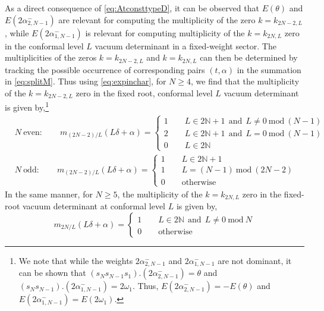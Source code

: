 As a direct consequence of \eqref{eq:AtconsttypeD}, it can be observed that $E(\theta)$ and $E(2\alpha^-_{2,N-1})$ are relevant for computing the multiplicity of the zero $k = k_{2N-2,L}$, while $E(2\alpha^-_{1,N-1})$ is relevant for computing multiplicity of the $k = k_{2N,L}$ zero in the conformal level $L$ vacuum determinant in a fixed-weight sector. The multiplicities of the zeros $k = k_{2N-2,L}$ and $k = k_{2N,L}$ can then be determined by tracking the possible occurrence of corresponding pairs $(t,\alpha)$ in the summation in \eqref{eq:splitM}. Thus using \eqref{eq:expinchar}, for $N \geqslant 4$, we find that the multiplicity of the $k = k_{2N-2,L}$ zero in the fixed root, conformal level $L$ vacuum determinant is given by,\footnote{We note that while the weights $2\alpha^-_{2,N-1}$ and $2\alpha^-_{1,N-1}$ are not dominant, it can be shown that $(s_N s_{N-1}s_1).(2\alpha^-_{2,N-1}) = \theta$ and $(s_N s_{N-1}).(2\alpha^-_{1,N-1}) = 2\omega_1$. Thus, $E(2\alpha^-_{2,N-1}) = -E(\theta)$ and $E(2\alpha^-_{1,N-1}) = E(2\omega_1)$.} 
\begin{equation} \label{eq:Lmultofk2Nm2}
\begin{split}
    &N \ \text{even}: \qquad m_{(2N-2)/L}(L\delta+\alpha) = \begin{cases}
        1 \qquad L \in 2\mathbb{N}+1 \ \ \text{and} \ \ L \neq 0~\text{mod}~(N-1) \\
        2 \qquad L \in 2\mathbb{N}+1 \ \ \text{and} \ \ L = 0~\text{mod}~(N-1) \\
        0 \qquad L \in 2\mathbb{N}
    \end{cases} \\
    &N \ \text{odd}: \qquad m_{(2N-2)/L}(L\delta+\alpha) = \begin{cases}
        1 \qquad L \in 2\mathbb{N}+1  \\
        1 \qquad L = (N-1)~\text{mod}~(2N-2) \\
        0 \qquad \text{otherwise}
    \end{cases}
\end{split}
\end{equation}
In the same manner, for $N \geqslant 5$, the multiplicity of the $k = k_{2N,L}$ zero in the fixed-root vacuum determinant at conformal level $L$ is given by,
\begin{equation} \label{eq:Lmultofk2N}
   m_{2N/L}(L\delta+\alpha) = \begin{cases}
        1 \qquad L \in 2\mathbb{N} \ \ \text{and} \ \ L \neq 0~\text{mod}~N \\
        0 \qquad \text{otherwise}
    \end{cases}
\end{equation}
